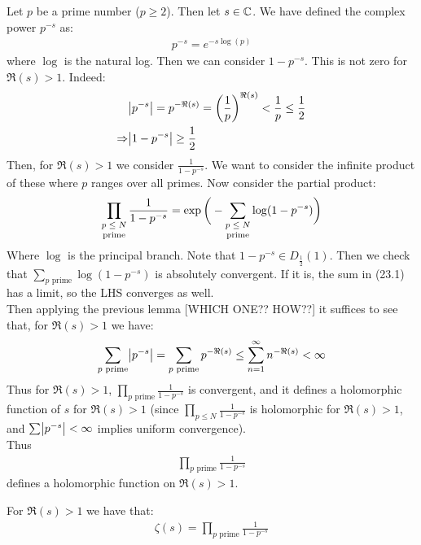 Let $p$ be a prime number ($p \geq 2$). Then let $s \in \mathbb{C}$. We have defined the complex power $p^{-s}$ as:
\begin{align*}
    p^{-s} = e^{-s\log(p)}
\end{align*}
where $\log$ is the natural log. Then we can consider $1-p^{-s}$. This is not zero for $\Re(s) > 1$. Indeed:
\begin{align*}
    &\abs{p^{-s}} = p^{-\Re(s)} = \left( \frac{1}{p} \right)^{\Re(s)} < \frac{1}{p} \leq \frac{1}{2}\\
    \Rightarrow &\abs{1-p^{-s}} \geq \frac{1}{2}
\end{align*}
Then, for $\Re(s)>1$ we consider $\frac{1}{1-p^{-s}}$. We want to consider the infinite product of these where $p$ ranges over all primes. Now consider the partial product:
\begin{align}
    \prod_{\text{\stackanchor{$p \leq N$}{prime}}} \frac{1}{1-p^{-s}} = \exp\bigg(-\sum_{\text{\stackanchor{$p \leq N$}{prime}}} \log(1-p^{-s}) \bigg)
\end{align}
Where $\log$ is the principal branch. Note that $1-p^{-s} \in D_{\frac{1}{2}}(1)$. Then we check that $\sum_{p \text{ prime}} \log(1-p^{-s})$ is absolutely convergent. If it is, the sum in (23.1) has a limit, so the LHS converges as well.\\

Then applying the previous lemma [WHICH ONE?? HOW??] it suffices to see that, for $\Re(s) > 1$ we have:
\begin{align*}
    \sum_{p \text{ prime}}\abs{p^{-s}} = \sum_{p \text{ prime}} p^{-\Re(s)} \leq \sum_{n =1}^\infty n^{-\Re(s)} < \infty
\end{align*}
Thus for $\Re(s) > 1$, $\prod_{p \text{ prime}} \frac{1}{1-p^{-s}}$ is convergent, and it defines a holomorphic function of $s$ for $\Re(s) >1$ (since $\prod_{p \leq N} \frac{1}{1-p^{-s}}$ is holomorphic for $\Re(s) >1$, and $\sum\abs{p^{-s}} < \infty$ implies uniform convergence).\\

Thus
\begin{align*}
    \prod_{p \text{ prime}} \frac{1}{1-p^{-s}}
\end{align*}
defines a holomorphic function on $\Re(s) > 1$.

\begin{theorem}[Euler]
For $\Re(s)>1$ we have that:
\begin{align*}
    \zeta(s) = \prod_{p \text{ prime}} \frac{1}{1-p^{-s}}
\end{align*}

\end{theorem}


